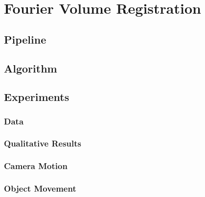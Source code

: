 \section{Fourier Volume Registration}

\subsection{Pipeline}
\subsection{Algorithm}

\subsection{Experiments}
\subsubsection{Data}
\subsubsection{Qualitative Results}
\subsubsection{Camera Motion}
\subsubsection{Object Movement}